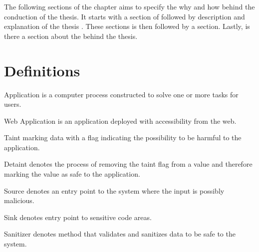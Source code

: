 The following sections of the chapter aims to specify the why and how behind the conduction of the thesis. It starts with a section of \textit{} followed by \textit{} description and explanation of the thesis \textit{}. These sections is then followed by a \textit{} section. Lastly, is there a section about the \textit{} behind the thesis.


\section{Definitions}
\label{Definitions}
\begin{definition}{Application}
    is a computer process constructed to solve one or more tasks for users.
    \\
\end{definition}

\begin{definition}{Web Application}
    is an application deployed with accessibility from the web.
    \\
\end{definition}

\begin{definition}{Taint}
    marking data with a flag indicating the possibility to be harmful to the application.
    \\
\end{definition}

\begin{definition}{Detaint}
    denotes the process of removing the taint flag from a value and therefore marking the value as safe to the application.
    \\
\end{definition}

\begin{definition}{Source}
    denotes an entry point to the system where the input is possibly malicious.
    \\
\end{definition}

\begin{definition}{Sink}
    denotes entry point to sensitive code areas.
    \\
\end{definition}

\begin{definition}{Sanitizer}
    denotes method that validates and sanitizes data to be safe to the system.
    \\
\end{definition}

